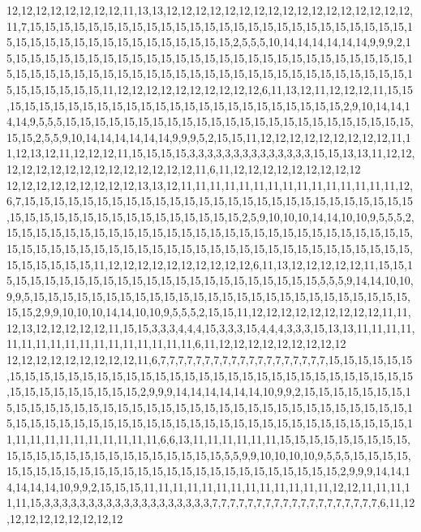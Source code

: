 12,12,12,12,12,12,12,12,11,13,13,12,12,12,12,12,12,12,12,12,12,12,12,12,12,12,12,12,11,7,15,15,15,15,15,15,15,15,15,15,15,15,15,15,15,15,15,15,15,15,15,15,15,15,15,15,15,15,15,15,15,15,15,15,15,15,15,15,15,15,15,15,2,5,5,5,10,14,14,14,14,14,14,9,9,9,2,15,15,15,15,15,15,15,15,15,15,15,15,15,15,15,15,15,15,15,15,15,15,15,15,15,15,15,15,15,15,15,15,15,15,15,15,15,15,15,15,15,15,15,15,15,15,15,15,15,15,15,15,15,15,15,15,15,15,15,15,15,15,15,11,12,12,12,12,12,12,12,12,12,12,6,11,13,12,11,12,12,12,11,15,15,15,15,15,15,15,15,15,15,15,15,15,15,15,15,15,15,15,15,15,15,15,15,15,2,9,10,14,14,14,14,9,5,5,5,15,15,15,15,15,15,15,15,15,15,15,15,15,15,15,15,15,15,15,15,15,15,15,15,15,15,2,5,5,9,10,14,14,14,14,14,14,9,9,9,5,2,15,15,11,12,12,12,12,12,12,12,12,12,11,11,12,13,12,11,12,12,12,11,15,15,15,15,3,3,3,3,3,3,3,3,3,3,3,3,3,3,15,15,13,13,11,12,12,12,12,12,12,12,12,12,12,12,12,12,12,12,11,6,11,12,12,12,12,12,12,12,12,12
12,12,12,12,12,12,12,12,12,13,13,12,11,11,11,11,11,11,11,11,11,11,11,11,11,11,11,12,6,7,15,15,15,15,15,15,15,15,15,15,15,15,15,15,15,15,15,15,15,15,15,15,15,15,15,15,15,15,15,15,15,15,15,15,15,15,15,15,15,15,15,15,15,2,5,9,10,10,10,14,14,10,10,9,5,5,5,2,15,15,15,15,15,15,15,15,15,15,15,15,15,15,15,15,15,15,15,15,15,15,15,15,15,15,15,15,15,15,15,15,15,15,15,15,15,15,15,15,15,15,15,15,15,15,15,15,15,15,15,15,15,15,15,15,15,15,15,15,15,15,11,12,12,12,12,12,12,12,12,12,12,6,11,13,12,12,12,12,12,11,15,15,15,15,15,15,15,15,15,15,15,15,15,15,15,15,15,15,15,15,15,15,15,15,5,5,5,9,14,14,10,10,9,9,5,15,15,15,15,15,15,15,15,15,15,15,15,15,15,15,15,15,15,15,15,15,15,15,15,15,15,15,15,2,9,9,10,10,10,14,14,10,10,9,5,5,5,2,15,15,11,12,12,12,12,12,12,12,12,12,11,11,12,13,12,12,12,12,12,11,15,15,3,3,3,4,4,4,15,3,3,3,15,4,4,4,3,3,3,15,13,13,11,11,11,11,11,11,11,11,11,11,11,11,11,11,11,11,11,6,11,12,12,12,12,12,12,12,12,12
12,12,12,12,12,12,12,12,12,11,6,7,7,7,7,7,7,7,7,7,7,7,7,7,7,7,7,7,7,7,15,15,15,15,15,15,15,15,15,15,15,15,15,15,15,15,15,15,15,15,15,15,15,15,15,15,15,15,15,15,15,15,15,15,15,15,15,15,15,15,15,15,15,2,9,9,9,14,14,14,14,14,14,10,9,9,2,15,15,15,15,15,15,15,15,15,15,15,15,15,15,15,15,15,15,15,15,15,15,15,15,15,15,15,15,15,15,15,15,15,15,15,15,15,15,15,15,15,15,15,15,15,15,15,15,15,15,15,15,15,15,15,15,15,15,15,15,15,15,15,11,11,11,11,11,11,11,11,11,11,11,6,6,13,11,11,11,11,11,11,15,15,15,15,15,15,15,15,15,15,15,15,15,15,15,15,15,15,15,15,15,15,15,15,5,5,9,9,10,10,10,10,9,5,5,5,15,15,15,15,15,15,15,15,15,15,15,15,15,15,15,15,15,15,15,15,15,15,15,15,15,15,15,2,9,9,9,14,14,14,14,14,14,10,9,9,2,15,15,15,11,11,11,11,11,11,11,11,11,11,11,11,11,12,12,11,11,11,11,11,15,3,3,3,3,3,3,3,3,3,3,3,3,3,3,3,3,3,3,3,7,7,7,7,7,7,7,7,7,7,7,7,7,7,7,7,7,7,7,6,11,12,12,12,12,12,12,12,12,12
